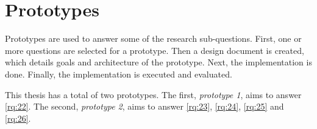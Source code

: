 \section{Prototypes}

Prototypes are used to answer some of the research sub-questions.
First, one or more questions are selected for a prototype.
Then a design document is created, which details goals and architecture of the prototype.
Next, the implementation is done.
Finally, the implementation is executed and evaluated.


This thesis has a total of two prototypes.
The first, \emph{prototype 1}, aims to answer \cref{rq:22}.
The second, \emph{prototype 2}, aims to answer \cref{rq:23}, \cref{rq:24}, \cref{rq:25} and \cref{rq:26}.




